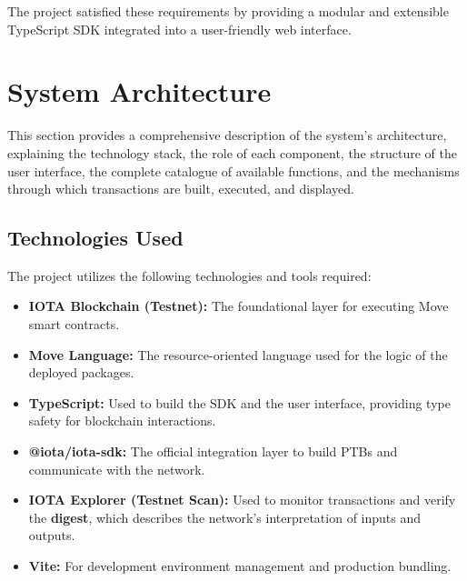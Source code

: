 \documentclass[12pt,a4paper]{article}
\begin{document}
The project satisfied these requirements by providing a modular and extensible TypeScript SDK integrated into a user-friendly web interface.

\section{System Architecture}

This section provides a comprehensive description of the system's architecture, explaining the technology stack, the role of each component, the structure of the user interface, the complete catalogue of available functions, and the mechanisms through which transactions are built, executed, and displayed.

\subsection{Technologies Used}

The project utilizes the following technologies and tools required:

\begin{itemize}
    \item \textbf{IOTA Blockchain (Testnet):} The foundational layer for executing Move smart contracts.
    \item \textbf{Move Language:} The resource-oriented language used for the logic of the deployed packages.
    \item \textbf{TypeScript:} Used to build the SDK and the user interface, providing type safety for blockchain interactions.
    \item \textbf{@iota/iota-sdk:} The official integration layer to build PTBs and communicate with the network.
    \item \textbf{IOTA Explorer (Testnet Scan):} Used to monitor transactions and verify the \textbf{digest}, which describes the network's interpretation of inputs and outputs.
    \item \textbf{Vite:} For development environment management and production bundling.
\end{itemize}

\end{document}

